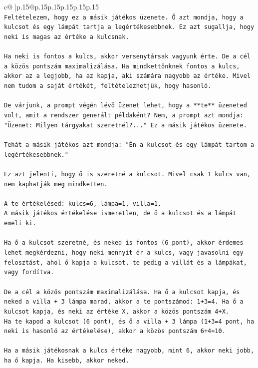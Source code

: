 \documentclass{article}
\begin{document}
{\begin{supertabular}{c@{$\;$}|p{.15\linewidth}@{}p{.15\linewidth}p{.15\linewidth}p{.15\linewidth}p{.15\linewidth}p{.15\linewidth}}
{{{\\ 
\texttt{Feltételezem, hogy ez a másik játékos üzenete. Ő azt mondja, hogy a kulcsot és egy lámpát tartja a legértékesebbnek. Ez azt sugallja, hogy neki is magas az értéke a kulcsnak.} \\
\\ 
\texttt{Ha neki is fontos a kulcs, akkor versenytársak vagyunk érte. De a cél a közös pontszám maximalizálása. Ha mindkettőnknek fontos a kulcs, akkor az a legjobb, ha az kapja, aki számára nagyobb az értéke. Mivel nem tudom a saját értékét, feltételezhetjük, hogy hasonló.} \\
\\ 
\texttt{De várjunk, a prompt végén lévő üzenet lehet, hogy a **te** üzeneted volt, amit a rendszer generált példaként? Nem, a prompt azt mondja: "Üzenet: Milyen tárgyakat szeretnél?..." Ez a másik játékos üzenete.} \\
\\ 
\texttt{Tehát a másik játékos azt mondja: "Én a kulcsot és egy lámpát tartom a legértékesebbnek."} \\
\\ 
\texttt{Ez azt jelenti, hogy ő is szeretné a kulcsot. Mivel csak 1 kulcs van, nem kaphatják meg mindketten.} \\
\\ 
\texttt{A te értékelésed: kulcs=6, lámpa=1, villa=1.} \\
\texttt{A másik játékos értékelése ismeretlen, de ő a kulcsot és a lámpát emeli ki.} \\
\\ 
\texttt{Ha ő a kulcsot szeretné, és neked is fontos (6 pont), akkor érdemes lehet megkérdezni, hogy neki mennyit ér a kulcs, vagy javasolni egy felosztást, ahol ő kapja a kulcsot, te pedig a villát és a lámpákat, vagy fordítva.} \\
\\ 
\texttt{De a cél a közös pontszám maximalizálása. Ha ő a kulcsot kapja, és neked a villa + 3 lámpa marad, akkor a te pontszámod: 1+3=4. Ha ő a kulcsot kapja, és neki az értéke X, akkor a közös pontszám 4+X.} \\
\texttt{Ha te kapod a kulcsot (6 pont), és ő a villa + 3 lámpa (1+3=4 pont, ha neki is hasonló az értékelése), akkor a közös pontszám 6+4=10.} \\
\\ 
\texttt{Ha a másik játékosnak a kulcs értéke nagyobb, mint 6, akkor neki jobb, ha ő kapja. Ha kisebb, akkor neked.} \\
\\ 
}}}
\end{supertabular}}
\end{document}
